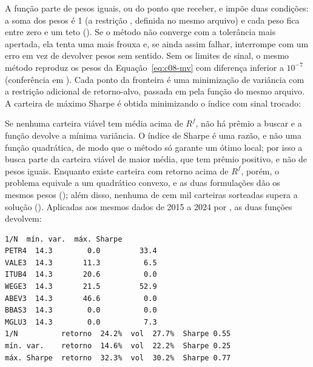 

A função  parte de pesos iguais, ou do ponto  que receber, e impõe duas condições: a soma dos pesos é 1 (a restrição , definida no mesmo arquivo) e cada peso fica entre zero e um teto (). Se o método não converge com a tolerância mais apertada, ela tenta uma mais frouxa e, se ainda assim falhar, interrompe com um erro em vez de devolver pesos sem sentido. Sem os limites de sinal, o mesmo método reproduz os pesos da Equação~\eqref{eq:c08-mv} com diferença inferior a $10^{-7}$ (conferência em ). Cada ponto da fronteira é uma minimização de variância com a restrição adicional de retorno-alvo, passada em  pela função  do mesmo arquivo. A carteira de máximo Sharpe é obtida minimizando o índice com sinal trocado:



Se nenhuma carteira viável tem média acima de $R^f$, não há prêmio a buscar e a função devolve a mínima variância. O índice de Sharpe é uma razão, e não uma função quadrática, de modo que o método só garante um ótimo local; por isso a busca parte da carteira viável de maior média, que tem prêmio positivo, e não de pesos iguais. Enquanto existe carteira com retorno acima de $R^f$, porém, o problema equivale a um quadrático convexo, e as duas formulações dão os mesmos pesos (); além disso, nenhuma de cem mil carteiras sorteadas supera a solução (). Aplicadas aos mesmos dados de 2015 a 2024 por , as duas funções devolvem:

\begin{lstlisting}[style=saida]
        1/N  mín. var.  máx. Sharpe
PETR4  14.3        0.0         33.4
VALE3  14.3       11.3          6.5
ITUB4  14.3       20.6          0.0
WEGE3  14.3       21.5         52.9
ABEV3  14.3       46.6          0.0
BBAS3  14.3        0.0          0.0
MGLU3  14.3        0.0          7.3
1/N          retorno  24.2%  vol  27.7%  Sharpe 0.55
mín. var.    retorno  14.6%  vol  22.2%  Sharpe 0.25
máx. Sharpe  retorno  32.3%  vol  30.2%  Sharpe 0.77
\end{lstlisting}

